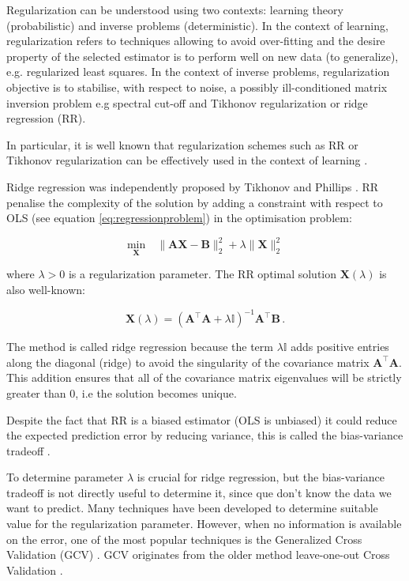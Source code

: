 Regularization can be understood using two contexts: learning theory (probabilistic) and inverse problems (deterministic). In the context of learning, regularization refers to techniques allowing to avoid over-fitting and the desire property of the selected estimator is to perform well on new data (to generalize), e.g. regularized least squares. In the context of inverse problems, regularization objective is to stabilise, with respect to noise, a possibly ill-conditioned matrix inversion problem e.g spectral cut-off and Tikhonov regularization or ridge regression (RR)\cite{ tikhonov1977}.

In particular, it is well known that regularization schemes such as RR or Tikhonov regularization can be effectively used in the context of learning \cite{vito2005}.

Ridge regression was independently proposed by Tikhonov \cite{tikhonov1963} and Phillips \cite{phillips1962}. RR penalise the complexity of the  solution by adding a constraint with respect to OLS (see equation \ref{eq:regressionproblem}) in the optimisation problem:

\begin{equation}
\label{eq:RRproblem}
\underset{\mathbf{X}}{\text{min}} \quad \|
\mathbf{A}\mathbf{\mathbf{X}} - \mathbf{B} \|_2^2 +\lambda \|
\mathbf{\mathbf{X}}\|_2^2 
\end{equation}

\noindent where $\lambda>0$ is a regularization parameter. The RR optimal solution $\mathbf{X}(\lambda)$ is also well-known: 

\begin{equation}
\label{eq:optsolRR}
\mathbf{X}(\lambda)=(\mathbf{A}^\top \mathbf{A}+ \lambda
\mathbb{I})^{-1}\mathbf{A}^\top \mathbf{B} \, . 
\end{equation}

The method is called ridge regression because the term $\lambda \mathbb{I}$ adds positive entries along the diagonal (ridge) to avoid the
singularity of the covariance matrix $\mathbf{A}^\top \mathbf{A}$. This addition ensures that all of the covariance matrix eigenvalues will be strictly greater than 0, i.e the solution becomes unique.

Despite the fact that RR is a biased estimator (OLS is unbiased) it could
reduce the expected prediction error by reducing variance, this is called the bias-variance tradeoff  \cite{hoerl1970}. 

To determine parameter $\lambda$ is crucial for ridge regression, but the bias-variance tradeoff is not directly useful to determine it, since que don't know the data we want to predict. Many techniques have been developed to determine suitable value for the regularization parameter. However, when no information is available on the error, one of the most popular techniques is the Generalized Cross Validation (GCV) \cite{bauer2011}. 
GCV originates from the older method leave-one-out Cross Validation \cite{stone1974}.

